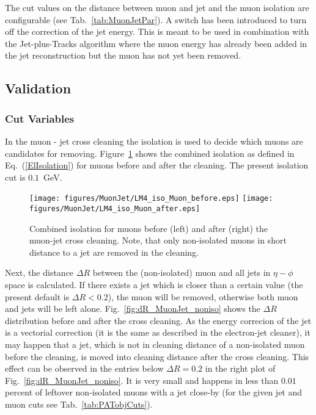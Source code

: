 \documentclass{cmspaper}
\begin{document}
The cut values on the distance between muon and jet and the muon isolation are configurable (see
Tab.~\ref{tab:MuonJetPar}). A switch has been introduced to turn off the
correction of the jet energy. This is meant to be used in combination with the
Jet-plus-Tracks algorithm where the muon energy has already been added in the
jet reconstruction but the muon has not yet been removed.

\subsection{Validation}
\subsubsection{Cut Variables}
In the muon - jet cross cleaning the isolation is used to decide which muons
are candidates for removing. Figure~\ref{fig:MuonIsolation} shows the combined
isolation as defined in Eq.~(\ref{ElIsolation}) for muons before and after the
cleaning. The present isolation cut is $0.1$~GeV. 

\begin{figure}[hb]
\begin{center}
    \texttt{[image: figures/MuonJet/LM4\_iso\_Muon\_before.eps]}
    \texttt{[image: figures/MuonJet/LM4\_iso\_Muon\_after.eps]}
    \caption{Combined isolation for muons before (left) and after (right) the
    muon-jet cross cleaning. Note, that only non-isolated muons in short
    distance to a jet are removed in the cleaning.}
\label{fig:MuonIsolation}
\end{center}
\end{figure}


Next, the distance \(\Delta R\) between the (non-isolated) muon and all jets in
\(\eta - \phi\) space is calculated. If there exists a jet which is closer than
a certain value (the present default is \(\Delta R < 0.2\)), the muon will be
removed, otherwise both muon and jets will be left alone.
Fig.~\ref{fig:dR_MuonJet_noniso} shows the $\Delta R$ distribution before and
after the cross cleaning. As the energy correcion of the jet is a vectorial
correction (it is the same as described in the electron-jet cleaner), it may
happen that a jet, which is not in cleaning distance of a non-isolated muon
before the cleaning, is moved into cleaning distance after the cross cleaning.
This effect can be observed in the entries below $\Delta R=0.2$ in the right plot of Fig.~\ref{fig:dR_MuonJet_noniso}. It is very small and happens in less than \(0.01\) percent of leftover
non-isolated muons with a jet close-by (for the given jet and muon
cuts see Tab.~\ref{tab:PATobjCuts}).
\end{document}
